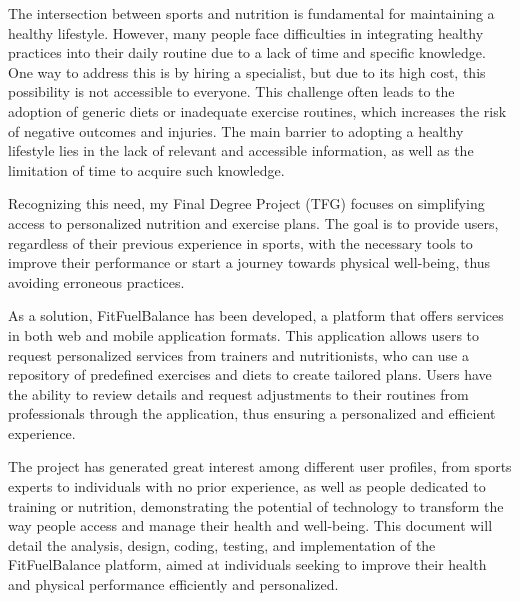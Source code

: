 The intersection between sports and nutrition is fundamental for maintaining a healthy lifestyle. However, many people face difficulties in integrating healthy practices into their daily routine due to a lack of time and specific knowledge. One way to address this is by hiring a specialist, but due to its high cost, this possibility is not accessible to everyone. This challenge often leads to the adoption of generic diets or inadequate exercise routines, which increases the risk of negative outcomes and injuries. The main barrier to adopting a healthy lifestyle lies in the lack of relevant and accessible information, as well as the limitation of time to acquire such knowledge.

Recognizing this need, my Final Degree Project (TFG) focuses on simplifying access to personalized nutrition and exercise plans. The goal is to provide users, regardless of their previous experience in sports, with the necessary tools to improve their performance or start a journey towards physical well-being, thus avoiding erroneous practices.

As a solution, FitFuelBalance has been developed, a platform that offers services in both web and mobile application formats. This application allows users to request personalized services from trainers and nutritionists, who can use a repository of predefined exercises and diets to create tailored plans. Users have the ability to review details and request adjustments to their routines from professionals through the application, thus ensuring a personalized and efficient experience.

The project has generated great interest among different user profiles, from sports experts to individuals with no prior experience, as well as people dedicated to training or nutrition, demonstrating the potential of technology to transform the way people access and manage their health and well-being. This document will detail the analysis, design, coding, testing, and implementation of the FitFuelBalance platform, aimed at individuals seeking to improve their health and physical performance efficiently and personalized.

